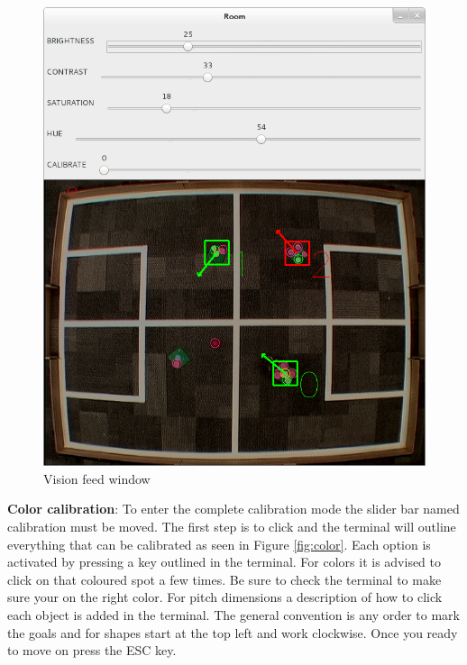 \documentclass[a4paper,12pt]{article}
\begin{document}
\begin{figure}
\vspace{-0.5cm}
\centering
\includegraphics[scale=0.25]{images/calibration1.png}
\caption{Vision feed window}
\label{fig:feed}
\vspace{-.6cm}
\end{figure} 
\textbf{Color calibration}: To enter the complete calibration mode the slider bar named calibration must be moved. The first step is to click and the terminal will outline everything that can be calibrated as seen in Figure \ref{fig:color}. Each option is activated by pressing a key outlined in the terminal. For colors it is advised to click on that coloured spot a few times. Be sure to check the terminal to make sure your on the right color. For pitch dimensions a description of how to click each object is added in the terminal. The general convention is any order to mark the goals and for shapes start at the top left and work clockwise. Once you ready to move on press the ESC key.
\end{document}
